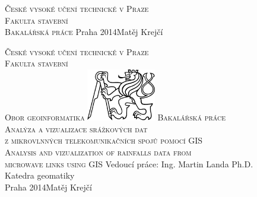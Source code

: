 \begin{center}
\newcommand{\napisCVUT}{České vysoké učení technické v Praze}
\newcommand{\napisFS}{Fakulta stavební}
\newcommand{\napisObor}{Obor geoinformatika}
\newcommand{\napisKatedra}{Katedra geomatiky}
\newcommand{\napisVedouci}{Ing. Martin Landa Ph.D.}
\newcommand{\napisAutor}{Matěj Krejčí}
\newcommand{\napisDatum}{Praha 2014}
\newcommand{\napisNazevI}{Analýza a vizualizace srážkových dat }
\newcommand{\napisNazevII}{z mikrovlnných telekomunikačních spojů pomocí GIS}
\newcommand{\napisNazevAjI}{Analysis and vizualization of rainfalls data from}
\newcommand{\napisNazevAjII}{microwave links using GIS}
\newcommand{\napisBakalarka}{Bakalářská práce}
\newcommand{\napisPraha}{Praha 2014}
%
\newcommand{\velka}[1]{\textsc{#1}}
%
% 
\newif\ifpatitul
\patitultrue

\ifpatitul
{\Large\velka{\napisCVUT}}\\
\velka{\Large\napisFS}\\
\vfill
{\LARGE\velka{\napisBakalarka}}
\vfill
{\large\napisPraha\hfill\napisAutor}
\newpage
\fi%


{\Large\velka{\napisCVUT}}\\
{\Large\velka{\napisFS}}\\
{\Large\velka{\napisObor}}
\vfill
\includegraphics[width=3cm]{logo_cvut_cb} %
\vfill
{\Large\velka{\napisBakalarka}}\\
{\Large\velka{\napisNazevI\\
\napisNazevII}}\\
{\large\velka{\napisNazevAjI\\
\napisNazevAjII}}
\vfill
{\large%
Vedoucí práce: \napisVedouci\\
\napisKatedra\\
\bigskip
\napisDatum\hfill\napisAutor}
\end{center}
